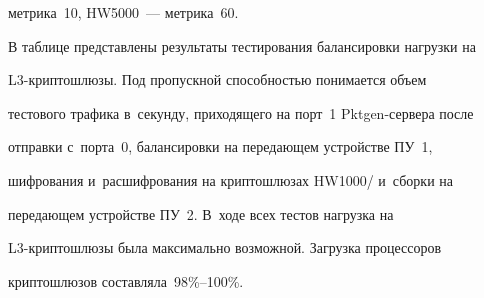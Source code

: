 метрика~10, HW5000~--- метрика~60.


  


  В таблице представлены результаты тестирования балансировки нагрузки на 


L3-крип\-то\-шлю\-зы. Под пропускной способностью понимается объем 


тестового трафика в~секунду, приходящего на порт~1 Pktgen-сер\-ве\-ра после 


отправки с~порта~0, балансировки на передающем устройстве ПУ~1, 


шифрования и~рас\-шиф\-ро\-ва\-ния на крип\-то\-шлю\-зах HW1000\!/ и~сборки на 


передающем устройстве ПУ~2. В~ходе всех тестов нагрузка на  


L3-крип\-то\-шлю\-зы была максимально возможной. Загрузка процессоров 


криптошлюзов составляла~98\%--100\%.


  


